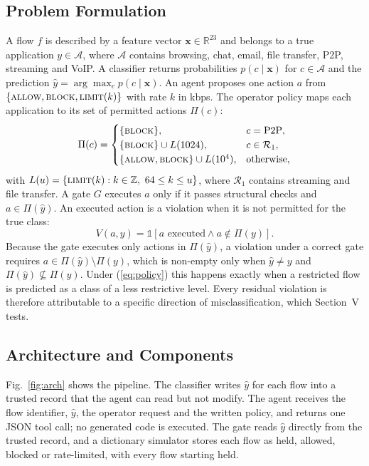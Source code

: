 \documentclass[conference]{IEEEtran}
\begin{document}
\subsection{Problem Formulation}
A flow $f$ is described by a feature vector $\mathbf{x} \in \mathbb{R}^{23}$ and belongs to a true application $y \in \mathcal{A}$, where $\mathcal{A}$ contains browsing, chat, email, file transfer, P2P, streaming and VoIP. A classifier returns probabilities $p(c \mid \mathbf{x})$ for $c \in \mathcal{A}$ and the prediction $\hat{y} = \arg\max_c p(c \mid \mathbf{x})$. An agent proposes one action $a$ from $\{\textsc{allow}, \textsc{block}, \textsc{limit}(k)\}$ with rate $k$ in kbps. The operator policy maps each application to its set of permitted actions $\Pi(c)$:
\begin{equation}
\Pi(c) =
\begin{cases}
\{\textsc{block}\}, & c = \text{P2P},\\
\{\textsc{block}\} \cup L(1024), & c \in \mathcal{R}_1,\\
\{\textsc{allow}, \textsc{block}\} \cup L(10^4), & \text{otherwise},
\end{cases}
\label{eq:policy}
\end{equation}
with $L(u) = \{\textsc{limit}(k): k \in \mathbb{Z},\ 64 \le k \le u\}$,
where $\mathcal{R}_1$ contains streaming and file transfer. A gate $G$ executes $a$ only if it passes structural checks and $a \in \Pi(\hat{y})$. An executed action is a violation when it is not permitted for the true class:
\begin{equation}
V(a, y) = \mathbb{1}\left[a \text{ executed} \wedge a \notin \Pi(y)\right].
\label{eq:violation}
\end{equation}
Because the gate executes only actions in $\Pi(\hat{y})$, a violation under a correct gate requires $a \in \Pi(\hat{y}) \setminus \Pi(y)$, which is non-empty only when $\hat{y} \neq y$ and $\Pi(\hat{y}) \not\subseteq \Pi(y)$. Under (\ref{eq:policy}) this happens exactly when a restricted flow is predicted as a class of a less restrictive level. Every residual violation is therefore attributable to a specific direction of misclassification, which Section~V tests.

\subsection{Architecture and Components}
Fig.~\ref{fig:arch} shows the pipeline. The classifier writes $\hat{y}$ for each flow into a trusted record that the agent can read but not modify. The agent receives the flow identifier, $\hat{y}$, the operator request and the written policy, and returns one JSON tool call; no generated code is executed. The gate reads $\hat{y}$ directly from the trusted record, and a dictionary simulator stores each flow as held, allowed, blocked or rate-limited, with every flow starting held.
\end{document}
